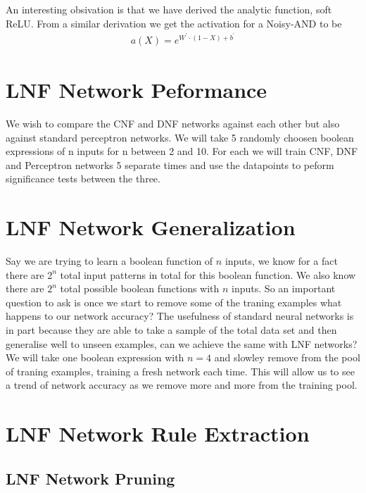 \documentclass{article}
\theoremstyle{definition}
\begin{document}
An interesting obsivation is that we have derived the analytic function, soft ReLU. From a similar derivation we get the activation for a Noisy-AND to be
\begin{align*}
a(X) = e^{W^{'} \cdot (1 - X) + b^{'}}
\end{align*}

\section{LNF Network Peformance}
We wish to compare the CNF and DNF networks against each other but also against standard perceptron networks. We will take 5 randomly choosen boolean expressions of n inputs for n between 2 and 10. For each we will train CNF, DNF and Perceptron networks 5 separate times and use the datapoints to peform significance tests between the three.

\section{LNF Network Generalization}
Say we are trying to learn a boolean function of $n$ inputs, we know for a fact there are $2^n$ total input patterns in total for this boolean function. We also know there are $2^n$ total possible boolean functions with $n$ inputs. So an important question to ask is once we start to remove some of the traning examples what happens to our network accuracy? The usefulness of standard neural networks is in part because they are able to take a sample of the total data set and then generalise well to unseen examples, can we achieve the same with LNF networks?\\

We will take one boolean expression with $n = 4$ and slowley remove from the pool of traning examples, training a fresh network each time. This will allow us to see a trend of network accuracy as we remove more and more from the training pool.

\section{LNF Network Rule Extraction}

\subsection{LNF Network Pruning}


\medskip


\end{document}
